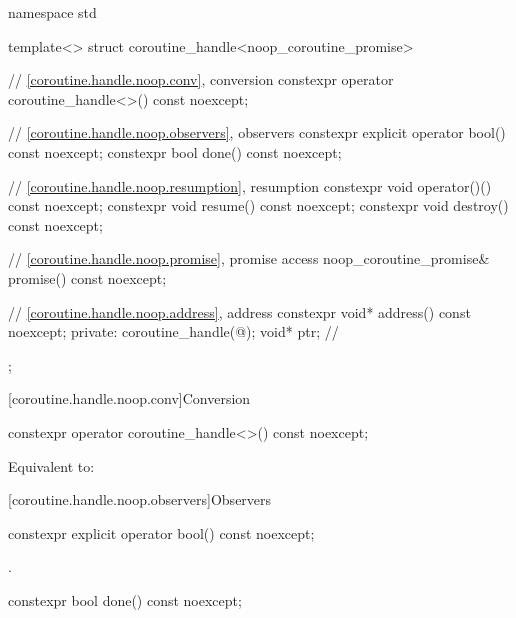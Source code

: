 %
\begin{codeblock}
namespace std {
  template<>
  struct coroutine_handle<noop_coroutine_promise>
  {
    // \ref{coroutine.handle.noop.conv}, conversion
    constexpr operator coroutine_handle<>() const noexcept;

    // \ref{coroutine.handle.noop.observers}, observers
    constexpr explicit operator bool() const noexcept;
    constexpr bool done() const noexcept;

    // \ref{coroutine.handle.noop.resumption}, resumption
    constexpr void operator()() const noexcept;
    constexpr void resume() const noexcept;
    constexpr void destroy() const noexcept;

    // \ref{coroutine.handle.noop.promise}, promise access
    noop_coroutine_promise& promise() const noexcept;

    // \ref{coroutine.handle.noop.address}, address
    constexpr void* address() const noexcept;
  private:
    coroutine_handle(@\unspec@);
    void* ptr;  // \expos
  };
}
\end{codeblock}

[coroutine.handle.noop.conv]{Conversion}

%
\begin{itemdecl}
constexpr operator coroutine_handle<>() const noexcept;
\end{itemdecl}

\begin{itemdescr}
\pnum
\effects
Equivalent to: 
\end{itemdescr}

[coroutine.handle.noop.observers]{Observers}

%
\begin{itemdecl}
constexpr explicit operator bool() const noexcept;
\end{itemdecl}

\begin{itemdescr}
\pnum
\returns
{}.
\end{itemdescr}

%
\begin{itemdecl}
constexpr bool done() const noexcept;
\end{itemdecl}

